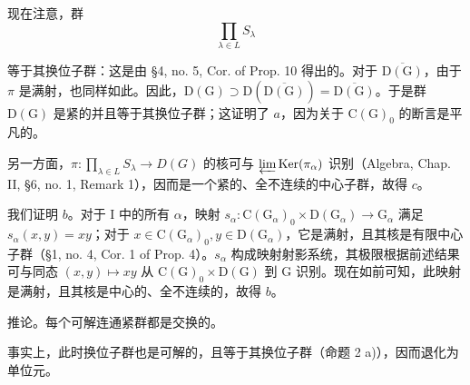 现在注意，群
\[
\prod_ {\lambda \in L} S _ {\lambda}
\]

等于其换位子群：这是由 §4, no. 5, Cor. of Prop. 10 得出的。对于 \(\overline{\mathrm{D(G)}}\)，由于 \(\pi\) 是满射，也同样如此。因此，\(\mathrm{D(G)} \supset \mathrm{D}(\overline{\mathrm{D(G)}}) = \overline{\mathrm{D(G)}}\)。于是群 \(\mathrm{D(G)}\) 是紧的并且等于其换位子群；这证明了 \(a\)，因为关于 \(\mathrm{C(G)}_0\) 的断言是平凡的。

另一方面，\(\pi : \prod_{\lambda \in L} S_{\lambda} \to D(G)\) 的核可与 \(\varprojlim \operatorname{Ker}(\pi_{\alpha})\) 识别（Algebra, Chap. II, §6, no. 1, Remark 1），因而是一个紧的、全不连续的中心子群，故得 \(c\)。

我们证明 \(b\)。对于 I 中的所有 \(\alpha\)，映射 \(s_{\alpha}: \mathrm{C}(\mathrm{G}_{\alpha})_0 \times \mathrm{D}(\mathrm{G}_{\alpha}) \to \mathrm{G}_{\alpha}\) 满足 \(s_{\alpha}(x,y) = xy\)；对于 \(x \in \mathrm{C}(\mathrm{G}_{\alpha})_0, y \in \mathrm{D}(\mathrm{G}_{\alpha})\)，它是满射，且其核是有限中心子群（§1, no. 4, Cor. 1 of Prop. 4）。\(s_{\alpha}\) 构成映射射影系统，其极限根据前述结果可与同态 \((x,y) \mapsto xy\) 从 \(\mathrm{C}(\mathrm{G})_0 \times \mathrm{D}(\mathrm{G})\) 到 \(\mathrm{G}\) 识别。现在如前可知，此映射是满射，且其核是中心的、全不连续的，故得 \(b\)。

推论。每个可解连通紧群都是交换的。

事实上，此时换位子群也是可解的，且等于其换位子群（命题 2 a)），因而退化为单位元。

